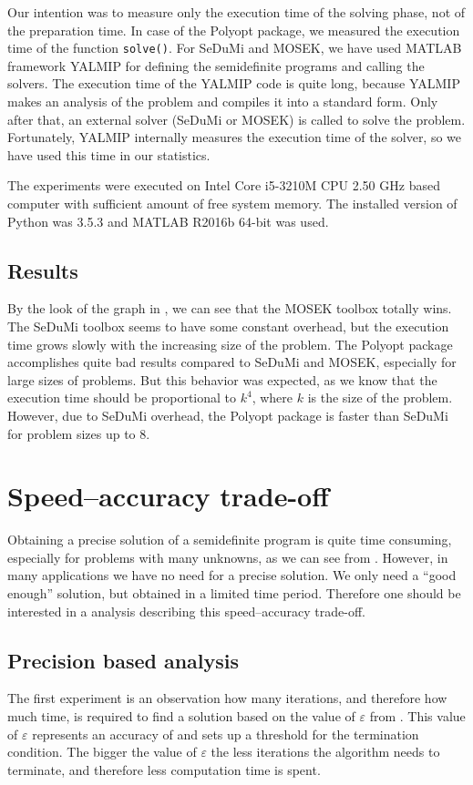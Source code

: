 Our intention was to measure only the execution time of the solving phase, not of the preparation time.
In case of the Polyopt package, we measured the execution time of the function \texttt{solve()}.
For SeDuMi and MOSEK, we have used MATLAB framework YALMIP \cite{yalmip} for defining the semidefinite programs and calling the solvers.
The execution time of the YALMIP code is quite long, because YALMIP makes an analysis of the problem and compiles it into a standard form.
Only after that, an external solver (SeDuMi or MOSEK) is called to solve the problem.
Fortunately, YALMIP internally measures the execution time of the solver, so we have used this time in our statistics.

The experiments were executed on Intel Core i5-3210M CPU 2.50 GHz based computer with sufficient amount of free system memory.
The installed version of Python was 3.5.3 and MATLAB R2016b 64-bit was used.

\subsection{Results}
By the look of the graph in , we can see that the MOSEK toolbox totally wins.
The SeDuMi toolbox seems to have some constant overhead, but the execution time grows slowly with the increasing size of the problem.
The Polyopt package accomplishes quite bad results compared to SeDuMi and MOSEK, especially for large sizes of problems.
But this behavior was expected, as we know that the execution time should be proportional to $k^4$, where $k$ is the size of the problem.
However, due to SeDuMi overhead, the Polyopt package is faster than SeDuMi for problem sizes up to 8.

\section{Speed--accuracy trade-off}
Obtaining a precise solution of a semidefinite program is quite time consuming, especially for problems with many unknowns, as we can see from .
However, in many applications we have no need for a precise solution.
We only need a ``good enough'' solution, but obtained in a limited time period.
Therefore one should be interested in a analysis describing this speed--accuracy trade-off.

\subsection{Precision based analysis}

The first experiment is an observation how many iterations, and therefore how much time, is required to find a solution based on the value of $\varepsilon$ from .
This value of $\varepsilon$ represents an accuracy of  and sets up a threshold for the termination condition.
The bigger the value of $\varepsilon$ the less iterations the algorithm needs to terminate, and therefore less computation time is spent.

